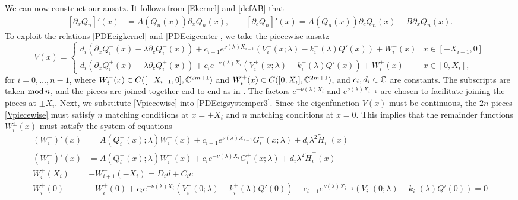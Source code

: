 \documentclass[10pt,reqno]{amsart}
\theoremstyle{plain}
\theoremstyle{definition}
\theoremstyle{remark}
\numberwithin{theorem}{section}
\numberwithin{equation}{section}
\begin{document}
We can now construct our ansatz. It follows from \cref{Ekernel} and \cref{defAB} that
\begin{equation}\label{PDEeigkernel}
\begin{aligned}
{[\partial_x Q_n]}'(x) &= A(Q_n(x))\partial_x Q_n(x), \qquad
{[\partial_c Q_n]}'(x) = A(Q_n(x))\partial_c Q_n(x) - B \partial_x Q_n(x).
\end{aligned}
\end{equation}
To exploit the relations \eqref{PDEeigkernel} and \eqref{PDEeigcenter}, we take the piecewise ansatz
\begin{equation}\label{Vpiecewise}
V(x) = \begin{cases}
d_i (\partial_x Q_i^-(x) - \lambda \partial_c Q_i^-(x)) + c_{i-1} e^{\nu(\lambda)X_{i-1} }( V_i^-(x; \lambda) - k_i^-(\lambda) Q'(x) ) + W_i^-(x) & x \in [-X_{i-1}, 0] \\
d_i (\partial_x Q_i^+(x) - \lambda \partial_c Q_i^+(x)) + c_i e^{-\nu(\lambda)X_i }( V_i^+(x; \lambda) - k_i^+(\lambda) Q'(x) ) + W_i^+(x) & x \in [0, X_i],
\end{cases}
\end{equation}
for $i = 0, \dots, n-1$, where $W_i^-(x) \in C([-X_{i-1}, 0], \mathbb{C}^{2m+1})$ and $W_i^+(x) \in C([0, X_i], \mathbb{C}^{2m+1})$, and $c_i, d_i \in \mathbb{C}$ are constants. The subscripts are taken $\mathop\mathrm{mod}\nolimits n$, and the pieces are joined together end-to-end as in \cite{Sandstede1998}. The factors $e^{-\nu(\lambda)X_i}$ and $e^{\nu(\lambda)X_{i-1}}$ are chosen to facilitate joining the pieces at $\pm X_i$. Next, we substitute \cref{Vpiecewise} into \cref{PDEeigsystemper3}. Since the eigenfunction $V(x)$ must be continuous, the $2n$ pieces \cref{Vpiecewise} must satisfy $n$ matching conditions at $x = \pm X_i$ and $n$ matching conditions at $x = 0$. This implies that the remainder functions $W_i^\pm(x)$ must satisfy the system of equations
\begin{equation}\label{eigsystem0}
\begin{aligned}
(W_i^-)'(x) &= A(Q_i^-(x); \lambda) W_i^-(x) + c_{i-1} e^{\nu(\lambda)X_{i-1}}  G_i^-(x; \lambda) + d_i \lambda^2 \tilde{H}_i^-(x) \\
(W_i^+)'(x) &= A(Q_i^+(x); \lambda) W_i^+(x) + c_i e^{-\nu(\lambda)X_i} G_i^+(x; \lambda) + d_i \lambda^2 \tilde{H}_i^+(x) \\
W_i^+(X_i) &- W_{i+1}^-(-X_i) = D_i d + C_i c \\
W_i^+(0) &- W_i^+(0) + c_i e^{-\nu(\lambda)X_i}(V_i^+(0; \lambda) - k_i^+(\lambda) Q'(0) )  - c_{i-1} e^{\nu(\lambda)X_{i-1}} ( V_i^-(0; \lambda) - k_i^-(\lambda) Q'(0) ) = 0
\end{aligned}
\end{equation}
\end{document}
